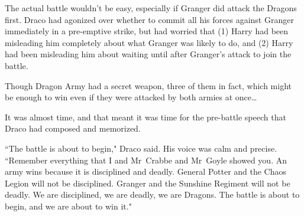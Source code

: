 The actual battle wouldn't be easy, especially if Granger did attack the Dragons first. Draco had agonized over whether to commit all his forces against Granger immediately in a pre-emptive strike, but had worried that (1) Harry had been misleading him completely about what Granger was likely to do, and (2) Harry had been misleading him about waiting until after Granger's attack to join the battle.

Though Dragon Army had a secret weapon, three of them in fact, which might be enough to win even if they were attacked by both armies at once{\ldots}

It was almost time, and that meant it was time for the pre-battle speech that Draco had composed and memorized.

``The battle is about to begin," Draco said. His voice was calm and precise. ``Remember everything that I and Mr~Crabbe and Mr~Goyle showed you. An army wins because it is disciplined and deadly. General Potter and the Chaos Legion will not be disciplined. Granger and the Sunshine Regiment will not be deadly. We are disciplined, we are deadly, we are Dragons. The battle is about to begin, and we are about to win it."


